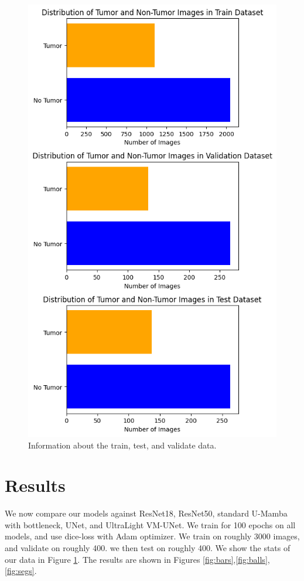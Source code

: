 \documentclass[conference]{IEEEtran}
\begin{document}
\begin{figure}[!t]
    \centering
    \includegraphics[width=\columnwidth]{imgs/data_stats.png}
    \caption{Information about the train, test, and validate data.}
    \label{fig:datastats}
\end{figure}

\section{Results}
We now compare our models against ResNet18, ResNet50, standard U-Mamba with bottleneck, UNet, and UltraLight VM-UNet. We train for 100 epochs on all models, and use dice-loss with Adam optimizer. We train on roughly 3000 images, and validate on roughly 400. we then test on roughly 400. We show the stats of our data in Figure \ref{fig:datastats}.
The results are shown in Figures \ref{fig:bars},\ref{fig:balls},\ref{fig:segs}.
\end{document}

